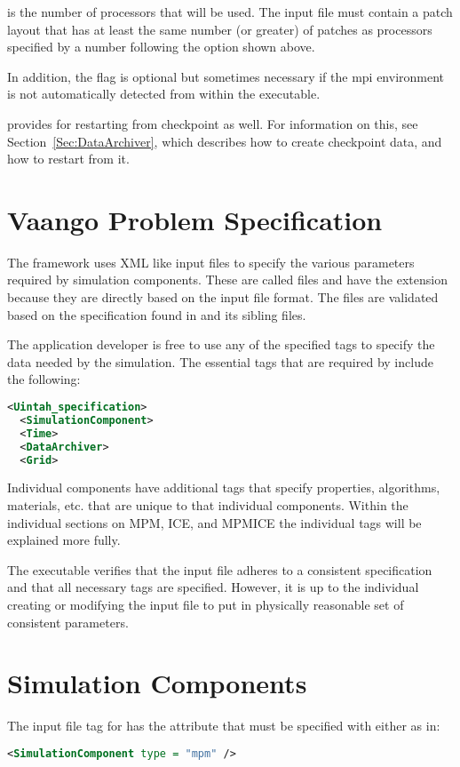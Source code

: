  is the number of processors that will
be used.  The input file must contain a patch layout that has at least
the same number (or greater) of patches as processors specified by a
number following the  option shown above.

In addition, the  flag is optional but sometimes
necessary if the mpi environment is not automatically detected from
within the  executable.

\Vaango provides for restarting from checkpoint as well.  For information on
this, see Section~\ref{Sec:DataArchiver}, which describes how to create
checkpoint data, and how to restart from it.

\section{Vaango Problem Specification} \label{Sec:UPS}
The \Vaango framework uses XML like input files to specify the various
parameters required by simulation components.  These are called
 files and have the extension 
because they are directly based on the \Uintah input file format.
The  files are validated based on the specification
found in 
and its sibling files.  

The application developer is free to use any of the specified tags to
specify the data needed by the simulation.  The essential tags that
are required by \Vaango include the following:
\begin{lstlisting}[language=XML]
  <Uintah_specification>
  <SimulationComponent>
  <Time>
  <DataArchiver>
  <Grid>
\end{lstlisting}

Individual components have additional tags that specify properties,
algorithms, materials, etc. that are unique to that individual
components.  Within the individual sections on MPM, ICE, and MPMICE
the individual tags will be explained more fully.

The  executable verifies that the input file adheres to a consistent
specification and that all necessary tags are specified.  However, it
is up to the individual creating or modifying the input file to put in
physically reasonable set of consistent parameters.

\section{Simulation Components} \label{Sec:SimulationComponent}
The input file tag for  has the 
attribute that must be specified with either 
as in:
\begin{lstlisting}[language=XML]
<SimulationComponent type = "mpm" />
\end{lstlisting}


